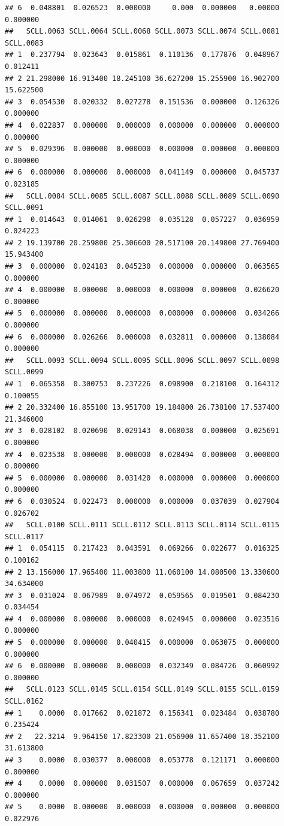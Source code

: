 \documentclass[
]{article}
\begin{document}
\begin{verbatim}
## 6  0.048801  0.026523  0.000000     0.000  0.000000   0.00000  0.000000
##   SCLL.0063 SCLL.0064 SCLL.0068 SCLL.0073 SCLL.0074 SCLL.0081 SCLL.0083
## 1  0.237794  0.023643  0.015861  0.110136  0.177876  0.048967  0.012411
## 2 21.298000 16.913400 18.245100 36.627200 15.255900 16.902700 15.622500
## 3  0.054530  0.020332  0.027278  0.151536  0.000000  0.126326  0.000000
## 4  0.022837  0.000000  0.000000  0.000000  0.000000  0.000000  0.000000
## 5  0.029396  0.000000  0.000000  0.000000  0.000000  0.000000  0.000000
## 6  0.000000  0.000000  0.000000  0.041149  0.000000  0.045737  0.023185
##   SCLL.0084 SCLL.0085 SCLL.0087 SCLL.0088 SCLL.0089 SCLL.0090 SCLL.0091
## 1  0.014643  0.014061  0.026298  0.035128  0.057227  0.036959  0.024223
## 2 19.139700 20.259800 25.306600 20.517100 20.149800 27.769400 15.943400
## 3  0.000000  0.024183  0.045230  0.000000  0.000000  0.063565  0.000000
## 4  0.000000  0.000000  0.000000  0.000000  0.000000  0.026620  0.000000
## 5  0.000000  0.000000  0.000000  0.000000  0.000000  0.034266  0.000000
## 6  0.000000  0.026266  0.000000  0.032811  0.000000  0.138084  0.000000
##   SCLL.0093 SCLL.0094 SCLL.0095 SCLL.0096 SCLL.0097 SCLL.0098 SCLL.0099
## 1  0.065358  0.300753  0.237226  0.098900  0.218100  0.164312  0.100055
## 2 20.332400 16.855100 13.951700 19.184800 26.738100 17.537400 21.346000
## 3  0.028102  0.020690  0.029143  0.068038  0.000000  0.025691  0.000000
## 4  0.023538  0.000000  0.000000  0.028494  0.000000  0.000000  0.000000
## 5  0.000000  0.000000  0.031420  0.000000  0.000000  0.000000  0.000000
## 6  0.030524  0.022473  0.000000  0.000000  0.037039  0.027904  0.026702
##   SCLL.0100 SCLL.0111 SCLL.0112 SCLL.0113 SCLL.0114 SCLL.0115 SCLL.0117
## 1  0.054115  0.217423  0.043591  0.069266  0.022677  0.016325  0.100162
## 2 13.156000 17.965400 11.003800 11.060100 14.080500 13.330600 34.634000
## 3  0.031024  0.067989  0.074972  0.059565  0.019501  0.084230  0.034454
## 4  0.000000  0.000000  0.000000  0.024945  0.000000  0.023516  0.000000
## 5  0.000000  0.000000  0.040415  0.000000  0.063075  0.000000  0.000000
## 6  0.000000  0.000000  0.000000  0.032349  0.084726  0.060992  0.000000
##   SCLL.0123 SCLL.0145 SCLL.0154 SCLL.0149 SCLL.0155 SCLL.0159 SCLL.0162
## 1    0.0000  0.017662  0.021872  0.156341  0.023484  0.038780  0.235424
## 2   22.3214  9.964150 17.823300 21.056900 11.657400 18.352100 31.613800
## 3    0.0000  0.030377  0.000000  0.053778  0.121171  0.000000  0.000000
## 4    0.0000  0.000000  0.031507  0.000000  0.067659  0.037242  0.000000
## 5    0.0000  0.000000  0.000000  0.000000  0.000000  0.000000  0.022976

\end{verbatim}
\end{document}
